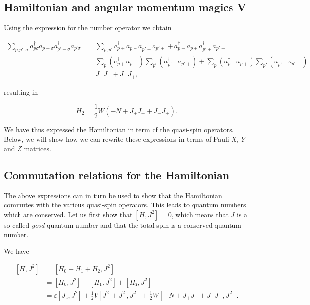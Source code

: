 \documentclass[11pt]{article}
\begin{document}
    \hypertarget{hamiltonian-and-angular-momentum-magics-v}{%
\subsection{Hamiltonian and angular momentum magics
V}\label{hamiltonian-and-angular-momentum-magics-v}}

Using the expression for the number operator we obtain

    \[
\begin{align*}
\sum_{p,p',\sigma} a_{p\sigma}^\dagger a_{p-\sigma} a_{p'-\sigma}^\dagger a_{p'\sigma}
&= \sum_{p,p'} a_{p+}^\dagger a_{p-} a_{p'-}^\dagger a_{p'+} +
a_{p-}^\dagger a_{p+} a_{p'+}^\dagger a_{p'-} \\
&= \sum_p \left( a_{p+}^\dagger a_{p-} \right)
\sum_{p'} \left( a_{p'-}^\dagger a_{p'+} \right) +
\sum_p \left( a_{p-}^\dagger a_{p+} \right)
\sum_{p'} \left( a_{p'+}^\dagger a_{p'-} \right) \\
&= J_+ J_- + J_- J_+,
\end{align*}
\]

    resulting in

    \hypertarget{eq:H2ny}{}

\[
\begin{equation}
H_2 = \frac{1}{2} W \left( -N + J_+ J_- + J_- J_+ \right).
\label{eq:H2ny} \tag{16}
\end{equation}
\]

    We have thus expressed the Hamiltonian in term of the quasi-spin
operators. Below, we will show how we can rewrite these expressions in
terms of Pauli \(X\), \(Y\) and \(Z\) matrices.

    \hypertarget{commutation-relations-for-the-hamiltonian}{%
\subsection{Commutation relations for the
Hamiltonian}\label{commutation-relations-for-the-hamiltonian}}

The above expressions can in turn be used to show that the Hamiltonian
commutes with the various quasi-spin operators. This leads to quantum
numbers which are conserved. Let us first show that \([H,J^2]=0\), which
means that \(J\) is a so-called \emph{good} quantum number and that the
total spin is a conserved quantum number.

We have

    \[
\begin{align*}
[H,J^2] &= [H_0 + H_1 + H_2,J^2] \\
&= [H_0,J^2] + [H_1,J^2] + [H_2,J^2] \\
&= \varepsilon [J_z,J^2] + \frac{1}{2} V [J_+^2 + J_-^2,J^2] +
\frac{1}{2} W [-N + J_+ J_- + J_- J_+,J^2]. \\
\end{align*}
\]
\end{document}
